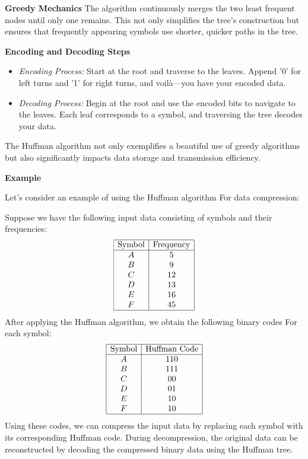 \documentclass[12pt]{book} %
\begin{document}
\textbf{Greedy Mechanics}
The algorithm continuously merges the two least frequent nodes until only one remains. This not only simplifies the tree’s construction but ensures that frequently appearing symbols use shorter, quicker paths in the tree.

\textbf{Encoding and Decoding Steps}
\begin{itemize}
    \item \textit{Encoding Process:} Start at the root and traverse to the leaves. Append '0' for left turns and '1' for right turns, and voilà—you have your encoded data.
    \item \textit{Decoding Process:} Begin at the root and use the encoded bits to navigate to the leaves. Each leaf corresponds to a symbol, and traversing the tree decodes your data.
\end{itemize}

The Huffman algorithm not only exemplifies a beautiful use of greedy algorithms but also significantly impacts data storage and transmission efficiency.

\textbf{Example}

Let's consider an example of using the Huffman algorithm For data compression:

Suppose we have the following input data consisting of symbols and their frequencies:
\FloatBarrier
\[
\begin{array}{|c|c|}
\hline
\text{Symbol} & \text{Frequency} \\
\hline
A & 5 \\
B & 9 \\
C & 12 \\
D & 13 \\
E & 16 \\
F & 45 \\
\hline
\end{array}
\]
\FloatBarrier
After applying the Huffman algorithm, we obtain the following binary codes For each symbol:
\FloatBarrier
\[
\begin{array}{|c|c|}
\hline
\text{Symbol} & \text{Huffman Code} \\
\hline
A & 110 \\
B & 111 \\
C & 00 \\
D & 01 \\
E & 10 \\
F & 10 \\
\hline
\end{array}
\]
\FloatBarrier
Using these codes, we can compress the input data by replacing each symbol with its corresponding Huffman code. During decompression, the original data can be reconstructed by decoding the compressed binary data using the Huffman tree.
\end{document}

